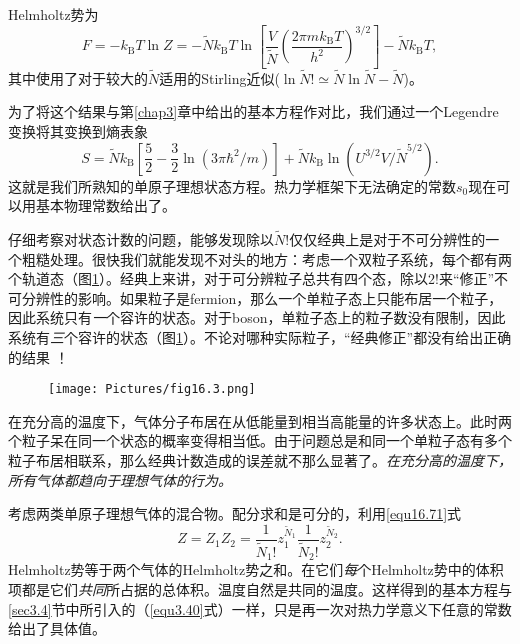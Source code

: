 Helmholtz势为
\begin{equation}
F=-k_\text{B}T\ln Z=-\tilde Nk_\text{B}T\ln\left[\frac{V}{\tilde N}\left(\frac{2\pi mk_\text{B}T}{h^2}\right)^{3/2}\right]-\tilde Nk_\text{B}T,
\end{equation}
其中使用了对于较大的$\tilde N$适用的Stirling近似($\ln\tilde N!\simeq \tilde N\ln\tilde N-\tilde N$)。

为了将这个结果与第\ref{chap3}章中给出的基本方程作对比，我们通过一个Legendre变换将其变换到熵表象
\begin{equation}
S=\tilde Nk_\text{B}\left[\frac{5}{2}-\frac{3}{2}\ln(3\pi\hbar^2/m)\right]+\tilde Nk_\text{B}\ln(U^{3/2}V/\tilde N^{5/2}).
\end{equation}
这就是我们所熟知的单原子理想状态方程。热力学框架下无法确定的常数$s_0$现在可以用基本物理常数给出了。

仔细考察对状态计数的问题，能够发现除以$\tilde N!$仅仅经典上是对于不可分辨性的一个粗糙处理。很快我们就能发现不对头的地方：考虑一个双粒子系统，每个都有两个轨道态（图\ref{fig16.3}）。经典上来讲，对于可分辨粒子总共有四个态，除以$2!$来``修正''不可分辨性的影响。如果粒子是fermion，那么一个单粒子态上只能布居一个粒子，因此系统只有{\it 一}个容许的状态。对于boson，单粒子态上的粒子数没有限制，因此系统有{\it 三}个容许的状态（图\ref{fig16.3}）。不论对哪种实际粒子，``经典修正''都没有给出正确的结果%
%
！

\begin{figure}
\centering
\texttt{[image: Pictures/fig16.3.png]}
\label{fig16.3}
\end{figure}

在充分高的温度下，气体分子布居在从低能量到相当高能量的许多状态上。此时两个粒子呆在同一个状态的概率变得相当低。由于问题总是和同一个单粒子态有多个粒子布居相联系，那么经典计数造成的误差就不那么显著了。{\it 在充分高的温度下，所有气体都趋向于理想气体的行为。}

考虑两类单原子理想气体的混合物。配分求和是可分的，利用\eqref{equ16.71}式
\begin{equation}
Z=Z_1Z_2=\frac{1}{\tilde N_1!}z_1^{\tilde N_1}\frac{1}{\tilde N_2!}z_2^{\tilde N_2}.
\label{equ16.74}
\end{equation}
Helmholtz势等于两个气体的Helmholtz势之和。在它们{\it 每}个Helmholtz势中的体积项都是它们{\it 共同}所占据的总体积。温度自然是共同的温度。这样得到的基本方程与\ref{sec3.4}节中所引入的（\eqref{equ3.40}式）一样，只是再一次对热力学意义下任意的常数给出了具体值。

